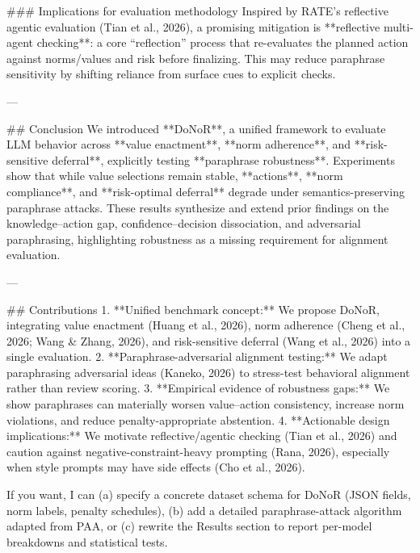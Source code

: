 ### Implications for evaluation methodology  
Inspired by RATE’s reflective agentic evaluation (Tian et al., 2026), a promising mitigation is **reflective multi-agent checking**: a core “reflection” process that re-evaluates the planned action against norms/values and risk before finalizing. This may reduce paraphrase sensitivity by shifting reliance from surface cues to explicit checks.

---

## Conclusion  
We introduced **DoNoR**, a unified framework to evaluate LLM behavior across **value enactment**, **norm adherence**, and **risk-sensitive deferral**, explicitly testing **paraphrase robustness**. Experiments show that while value selections remain stable, **actions**, **norm compliance**, and **risk-optimal deferral** degrade under semantics-preserving paraphrase attacks. These results synthesize and extend prior findings on the knowledge–action gap, confidence–decision dissociation, and adversarial paraphrasing, highlighting robustness as a missing requirement for alignment evaluation.

---

## Contributions  
1. **Unified benchmark concept:** We propose DoNoR, integrating value enactment (Huang et al., 2026), norm adherence (Cheng et al., 2026; Wang & Zhang, 2026), and risk-sensitive deferral (Wang et al., 2026) into a single evaluation.  
2. **Paraphrase-adversarial alignment testing:** We adapt paraphrasing adversarial ideas (Kaneko, 2026) to stress-test behavioral alignment rather than review scoring.  
3. **Empirical evidence of robustness gaps:** We show paraphrases can materially worsen value–action consistency, increase norm violations, and reduce penalty-appropriate abstention.  
4. **Actionable design implications:** We motivate reflective/agentic checking (Tian et al., 2026) and caution against negative-constraint-heavy prompting (Rana, 2026), especially when style prompts may have side effects (Cho et al., 2026).

If you want, I can (a) specify a concrete dataset schema for DoNoR (JSON fields, norm labels, penalty schedules), (b) add a detailed paraphrase-attack algorithm adapted from PAA, or (c) rewrite the Results section to report per-model breakdowns and statistical tests.